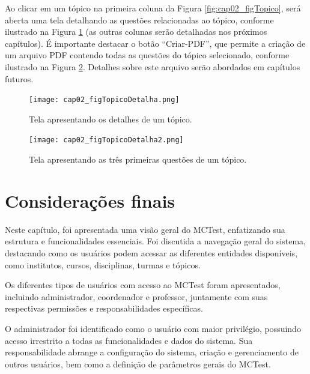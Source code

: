 Ao clicar em um tópico na primeira coluna da Figura \ref{fig:cap02_figTopico}, será aberta uma tela detalhando as questões relacionadas ao tópico, conforme ilustrado na Figura \ref{fig:cap02_figTopicoDetalha} (as outras colunas serão detalhadas nos próximos capítulos). É importante destacar o botão ``Criar-PDF'', que permite a criação de um arquivo PDF contendo todas as questões do tópico selecionado, conforme ilustrado na Figura \ref{fig:cap02_figTopicoDetalha2}. Detalhes sobre este arquivo serão abordados em capítulos futuros.

\begin{figure}[!ht]
  \centering
  \texttt{[image: cap02\_figTopicoDetalha.png]}
  \caption{Tela apresentando os detalhes de um tópico.}
  \label{fig:cap02_figTopicoDetalha}
\end{figure}

\begin{figure}[!ht]
  \centering
  \texttt{[image: cap02\_figTopicoDetalha2.png]}
  \caption{Tela apresentando as três primeiras questões de um tópico.}
  \label{fig:cap02_figTopicoDetalha2}
\end{figure}








\section{Considerações finais}

Neste capítulo, foi apresentada uma visão geral do MCTest, enfatizando sua estrutura e funcionalidades essenciais. Foi discutida a navegação geral do sistema, destacando como os usuários podem acessar as diferentes entidades disponíveis, como institutos, cursos, disciplinas, turmas e tópicos.

Os diferentes tipos de usuários com acesso ao MCTest foram apresentados, incluindo administrador, coordenador e professor, juntamente com suas respectivas permissões e responsabilidades específicas.

O administrador foi identificado como o usuário com maior privilégio, possuindo acesso irrestrito a todas as funcionalidades e dados do sistema. Sua responsabilidade abrange a configuração do sistema, criação e gerenciamento de outros usuários, bem como a definição de parâmetros gerais do MCTest.

